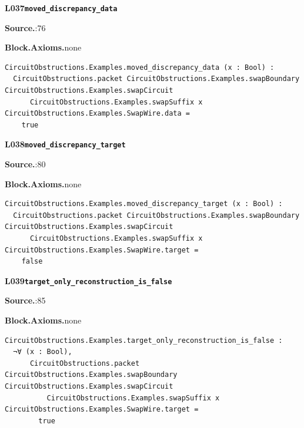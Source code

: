 \par\medskip\noindent\begin{minipage}{\textwidth}
{\small\bfseries L037\enspace\texttt{moved\_discrepancy\_data}\par}
{\footnotesize\raggedright\textbf{Source.}\enspace{}:76\par
\textbf{Block.}\quad\textbf{Axioms.}\enspace none\par}\nopagebreak
\begin{lstlisting}
CircuitObstructions.Examples.moved_discrepancy_data (x : Bool) :
  CircuitObstructions.packet CircuitObstructions.Examples.swapBoundary CircuitObstructions.Examples.swapCircuit
      CircuitObstructions.Examples.swapSuffix x CircuitObstructions.Examples.SwapWire.data =
    true
\end{lstlisting}
\end{minipage}\par

\par\medskip\noindent\begin{minipage}{\textwidth}
{\small\bfseries L038\enspace\texttt{moved\_discrepancy\_target}\par}
{\footnotesize\raggedright\textbf{Source.}\enspace{}:80\par
\textbf{Block.}\quad\textbf{Axioms.}\enspace none\par}\nopagebreak
\begin{lstlisting}
CircuitObstructions.Examples.moved_discrepancy_target (x : Bool) :
  CircuitObstructions.packet CircuitObstructions.Examples.swapBoundary CircuitObstructions.Examples.swapCircuit
      CircuitObstructions.Examples.swapSuffix x CircuitObstructions.Examples.SwapWire.target =
    false
\end{lstlisting}
\end{minipage}\par

\par\medskip\noindent\begin{minipage}{\textwidth}
{\small\bfseries L039\enspace\texttt{target\_only\_reconstruction\_is\_false}\par}
{\footnotesize\raggedright\textbf{Source.}\enspace{}:85\par
\textbf{Block.}\quad\textbf{Axioms.}\enspace none\par}\nopagebreak
\begin{lstlisting}
CircuitObstructions.Examples.target_only_reconstruction_is_false :
  ¬∀ (x : Bool),
      CircuitObstructions.packet CircuitObstructions.Examples.swapBoundary CircuitObstructions.Examples.swapCircuit
          CircuitObstructions.Examples.swapSuffix x CircuitObstructions.Examples.SwapWire.target =
        true
\end{lstlisting}
\end{minipage}\par

